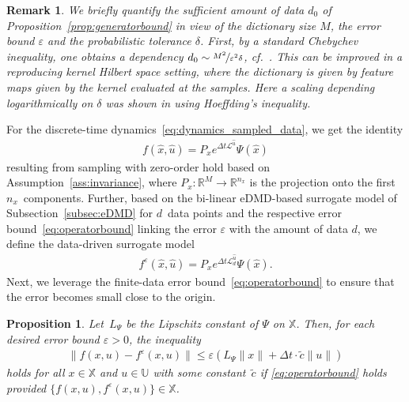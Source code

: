 \documentclass{article}
\numberwithin{equation}{section}
\newtheorem{proposition}[theorem]{Proposition}
\newtheorem{remark}[theorem]{Remark}
\newcommand{\nx}{n_x}
\newcommand{\N}{M}
\renewcommand{\d}{d}
\newcommand{\bX}{\mathbb X}
\newcommand{\bU}{\mathbb U}
\begin{document}
	\begin{remark}
		We briefly quantify the sufficient amount of data $d_0$ of Proposition~\ref{prop:generatorbound} in view of the dictionary size $\N$, the error bound $\varepsilon$ and the probabilistic tolerance $\delta$. 
		First, by a standard Chebychev inequality, one obtains a dependency $d_0 \sim \nicefrac{\N^2}{\varepsilon^2\delta}$, cf.\ \cite{SchaWort23,NuskPeit23}. 
		This can be improved in a reproducing kernel Hilbert space setting, where the dictionary is given by feature maps given by the kernel evaluated at the samples. Here a scaling depending logarithmically on $\delta$ was shown in \cite[Proposition 3.4]{PhilScha23} using Hoeffding's inequality.
	\end{remark}
	
	\noindent For the discrete-time dynamics~\eqref{eq:dynamics_sampled_data}, we get the identity
	\begin{align}\label{eq:dynamics_exact}
	f(\hat{x},\hat{u}) = P_{x} e^{\Delta t \mathcal{L}^{\hat{u}}} \Psi(\hat{x})
	\end{align}
	resulting from sampling with zero-order hold based on Assumption~\ref{ass:invariance}, where $P_x:\mathbb{R}^\N \to \mathbb{R}^{\nx}$ is the projection onto the first $\nx$~components.
	Further, based on the bi-linear eDMD-based surrogate model of Subsection~\ref{subsec:eDMD} for $\d$~data points and the respective error bound~\eqref{eq:operatorbound} linking the error $\varepsilon$ with the amount of data $\d$, we define the data-driven surrogate model
	\begin{align}\label{eq:dynamics_approx}
	f^\varepsilon(\hat{x},\hat{u}) = P_xe^{\Delta t \mathcal{L}^{\hat{u}}_\d} \Psi(\hat{x}).
	\end{align}
	Next, we leverage the finite-data error bound~\eqref{eq:operatorbound} to ensure that the error becomes small close to the origin.
	\begin{proposition}\label{prop:errbound}
		Let~$L_\Psi$ be the Lipschitz constant of $\Psi$ on $\bX$. 
		Then, for each desired error bound $\varepsilon > 0$, the inequality
		\begin{align}\label{eq:dynamics_bound}
		\|f(x,u)-f^\varepsilon(x,u)\| \leq \varepsilon \left( L_\Psi \| x \| + \Delta t \cdot \tilde{c} \| u \| \right)
		\end{align}
		holds for all $x \in \bX$ and $u \in \bU$ with some constant~$\tilde{c}$ if \eqref{eq:operatorbound} holds provided $\{ f(x,u), f^\varepsilon(x,u) \} \in \bX$. %
	\end{proposition}
\end{document}
